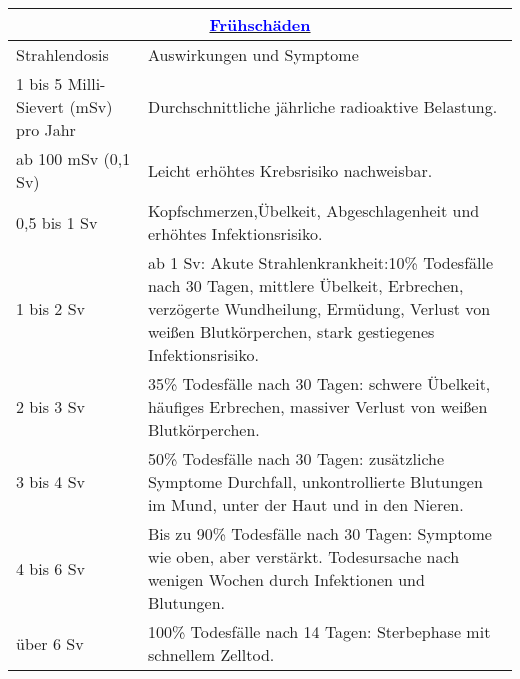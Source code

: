 {
\begin{tabular}{ |p{6.5cm}||p{9cm}| }
 \hline
 \multicolumn{2}{|c|}{\href{https://scilogs.spektrum.de/atommuell-debatte}
 {\textcolor{blue}{Frühschäden}}}\\
 \hline
 Strahlendosis& Auswirkungen und Symptome\\
  \hline
 1 bis 5 Milli-Sievert (mSv) pro Jahr&Durchschnittliche jährliche radioaktive Belastung.\\
  \hline
 ab 100 mSv (0,1 Sv)&Leicht erhöhtes Krebsrisiko nachweisbar.\\
 \hline
0,5 bis 1 Sv&Kopfschmerzen,Übelkeit, Abgeschlagenheit
                            und erhöhtes Infektionsrisiko.\\
 \hline
 1 bis 2 Sv&ab 1 Sv: Akute Strahlenkrankheit:10\% Todesfälle nach 30 Tagen,
             mittlere Übelkeit, Erbrechen, verzögerte Wundheilung, 
                     Ermüdung, Verlust von weißen Blutkörperchen, 
                     stark gestiegenes Infektionsrisiko.\\
 \hline
 2 bis 3 Sv&35\% Todesfälle nach 30 Tagen:
                       schwere Übelkeit, häufiges Erbrechen,
                        massiver Verlust von weißen Blutkörperchen.\\
  \hline
3 bis 4 Sv&50\% Todesfälle nach 30 Tagen:
                        zusätzliche Symptome Durchfall, 
                        unkontrollierte Blutungen im Mund, 
                        unter der Haut und in den Nieren.\\
  \hline
4 bis 6 Sv&Bis zu 90\% Todesfälle nach 30 Tagen:
                       Symptome wie oben, aber verstärkt.
                       Todesursache nach wenigen Wochen durch Infektionen und Blutungen.\\
 \hline
  über 6 Sv&100\% Todesfälle nach 14 Tagen:
            Sterbephase mit schnellem Zelltod.\\
 \hline

\end{tabular} \\

}
